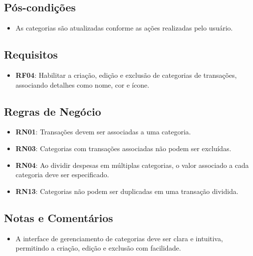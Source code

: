 \subsection*{Pós-condições}
\begin{addmargin}[1.5cm]{0cm}
    \begin{itemize}
        \item As categorias são atualizadas conforme as ações realizadas pelo usuário.
    \end{itemize}
\end{addmargin}

\subsection*{Requisitos}
\begin{addmargin}[1.5cm]{0cm}
	\begin{itemize}
		\item \textbf{RF04}: Habilitar a criação, edição e exclusão de categorias de transações, associando detalhes como nome, cor e ícone.
	\end{itemize}
\end{addmargin}

\subsection*{Regras de Negócio}
\begin{addmargin}[1.5cm]{0cm}
    \begin{itemize}
        \item \textbf{RN01}: Transações devem ser associadas a uma categoria.
        \item \textbf{RN03}: Categorias com transações associadas não podem ser excluídas.
        \item \textbf{RN04}: Ao dividir despesas em múltiplas categorias, o valor associado a cada categoria deve ser especificado.
        \item \textbf{RN13}: Categorias não podem ser duplicadas em uma transação dividida.
    \end{itemize}
\end{addmargin}

\subsection*{Notas e Comentários}
\begin{addmargin}[1.5cm]{0cm}
    \begin{itemize}
        \item A interface de gerenciamento de categorias deve ser clara e intuitiva, permitindo a criação, edição e exclusão com facilidade.
    \end{itemize}
\end{addmargin}
